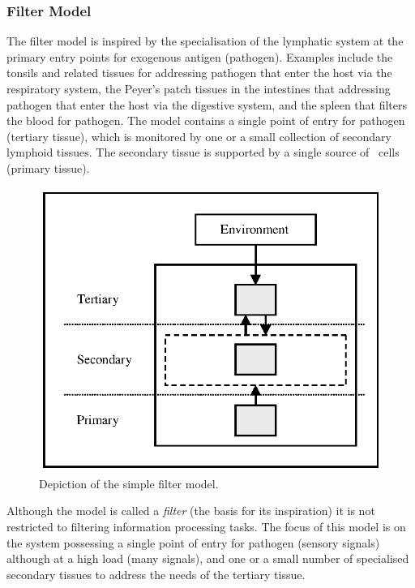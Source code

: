 %
%
\subsubsection{Filter Model}
The filter model is inspired by the specialisation of the lymphatic system at the primary entry points for exogenous antigen (pathogen). Examples include the tonsils and related tissues for addressing pathogen that enter the host via the respiratory system, the Peyer's patch tissues in the intestines that addressing pathogen that enter the host via the digestive system, and the spleen that filters the blood for pathogen. The model contains a single point of entry for pathogen (tertiary tissue), which is monitored by one or a small collection of secondary lymphoid tissues. The secondary tissue is supported by a single source of \naive\ cells (primary tissue).

\begin{figure}[ht]
	\centering
	\includegraphics[scale=0.75]{Tissues/tissues-models-filter}
	\caption{Depiction of the simple filter model.}
	\label{pic:tissues:architecture:filter}
\end{figure}

Although the model is called a \emph{filter} (the basis for its inspiration) it is not restricted to filtering information processing tasks. The focus of this model is on the system possessing a single point of entry for pathogen (sensory signals) although at a high load (many signals), and one or a small number of specialised secondary tissues to address the needs of the tertiary tissue. 

